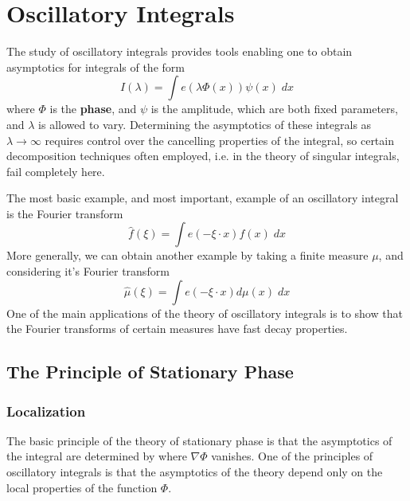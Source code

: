 \chapter{Oscillatory Integrals}

The study of oscillatory integrals provides tools enabling one to obtain asymptotics for integrals of the form
%
\[ I(\lambda) = \int e(\lambda \Phi(x)) \psi(x)\; dx \]
%
where $\Phi$ is the {\bf phase}, and $\psi$ is the amplitude, which are both fixed parameters, and $\lambda$ is allowed to vary. Determining the asymptotics of these integrals as $\lambda \to \infty$ requires control over the cancelling properties of the integral, so certain decomposition techniques often employed, i.e. in the theory of singular integrals, fail completely here.

\begin{example}
    The most basic example, and most important, example of an oscillatory integral is the Fourier transform
    \[ \widehat{f}(\xi) = \int e(-\xi \cdot x) f(x)\; dx \]
    More generally, we can obtain another example by taking a finite measure $\mu$, and considering it's Fourier transform
    \[ \widehat{\mu}(\xi) = \int e(- \xi \cdot x) d\mu(x)\; dx \]
    One of the main applications of the theory of oscillatory integrals is to show that the Fourier transforms of certain measures have fast decay properties.
\end{example}

\section{The Principle of Stationary Phase}

\subsection{Localization}

The basic principle of the theory of stationary phase is that the asymptotics of the integral are determined by where $\nabla \Phi$ vanishes. One of the principles of oscillatory integrals is that the asymptotics of the theory depend only on the local properties of the function $\Phi$.

